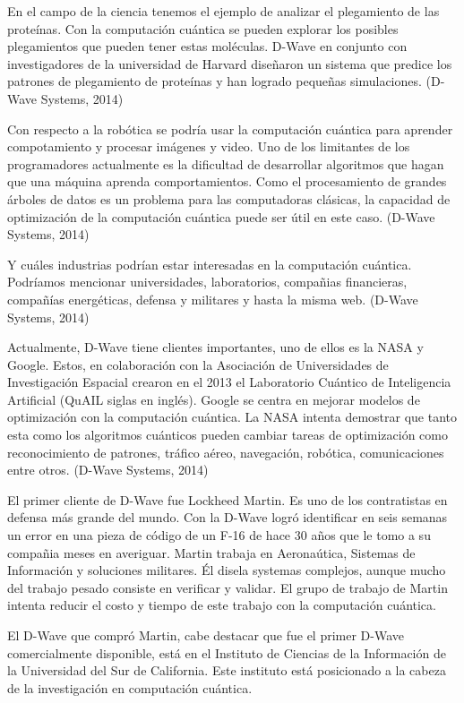 \documentclass[11pt,a4paper]{article}
\begin{document}
En el campo de la ciencia tenemos el ejemplo de analizar el plegamiento de las proteínas. Con la computación cuántica se pueden explorar los posibles plegamientos que pueden tener estas moléculas. D-Wave en conjunto con investigadores de la universidad de Harvard diseñaron un sistema que predice los patrones de plegamiento de proteínas y han logrado pequeñas simulaciones. (D-Wave Systems, 2014)

Con respecto a la robótica se podría usar la computación cuántica para aprender compotamiento y procesar imágenes y video. Uno de los limitantes de los programadores actualmente es la dificultad de desarrollar algoritmos que hagan que una máquina aprenda comportamientos. Como el procesamiento de grandes árboles de datos es un problema para las computadoras clásicas, la capacidad de optimización de la computación cuántica puede ser útil en este caso. (D-Wave Systems, 2014)

Y cuáles industrias podrían estar interesadas en la computación cuántica. Podríamos mencionar universidades, laboratorios, compañias financieras, compañías energéticas, defensa y militares y hasta la misma web. (D-Wave Systems, 2014)

Actualmente, D-Wave tiene clientes importantes, uno de ellos es la NASA y Google. Estos, en colaboración con la Asociación de Universidades de Investigación Espacial crearon en el 2013 el Laboratorio Cuántico de Inteligencia Artificial (QuAIL siglas en inglés). Google se centra en mejorar modelos de optimización con la computación cuántica. La NASA intenta demostrar que tanto esta como los algoritmos cuánticos pueden cambiar tareas de optimización como reconocimiento de patrones, tráfico aéreo, navegación, robótica, comunicaciones entre otros. (D-Wave Systems, 2014)

El primer cliente de D-Wave fue Lockheed Martin. Es uno de los contratistas en defensa más grande del mundo. Con la D-Wave logró identificar en seis semanas un error en una pieza de código de un F-16 de hace 30 años que le tomo a su compañia meses en averiguar. Martin trabaja en Aeronaútica, Sistemas de Información y soluciones militares. Él disela systemas complejos, aunque mucho del trabajo pesado consiste en verificar y validar. El grupo de trabajo de Martin intenta reducir el costo y tiempo de este trabajo con la computación cuántica.

El D-Wave que compró Martin, cabe destacar que fue el primer D-Wave comercialmente disponible, está en el Instituto de Ciencias de la Información de la Universidad del Sur de California. Este instituto está posicionado a la cabeza de la investigación en computación cuántica.
\end{document}
